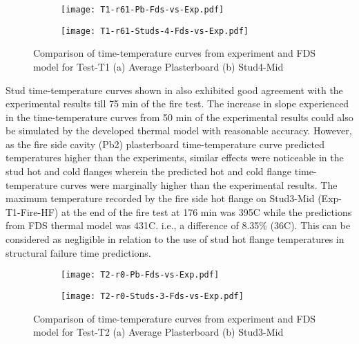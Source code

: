 \begin{figure}[!htbp]
	\centering
	\begin{subfigure}[b]{0.7\textwidth}
		\centering
		\texttt{[image: T1-r61-Pb-Fds-vs-Exp.pdf]}
		\caption{}
		\label{subfig:T1-r61-Pb-Fds-vs-Exp}
	\end{subfigure}
	\begin{subfigure}[b]{0.6\textwidth}
		\centering
		\texttt{[image: T1-r61-Studs-4-Fds-vs-Exp.pdf]}
		\caption{}
		\label{subfig:T1-r61-Studs-4-Fds-vs-Exp}
	\end{subfigure}
	   \caption{Comparison of time-temperature curves from experiment and FDS model for Test-T1 (a) Average Plasterboard (b) Stud4-Mid}
	   \label{fig:fds-output-pb-studs-t1}
\end{figure}

Stud time-temperature curves shown in  also exhibited good agreement with the experimental results till 75 min of the fire test. The increase in slope experienced in the time-temperature curves from 50 min of the experimental results could also be simulated by the developed thermal model with reasonable accuracy. However, as the fire side cavity (Pb2) plasterboard time-temperature curve predicted temperatures higher than the experiments, similar effects were noticeable in the stud hot and cold flanges wherein the predicted hot and cold flange time-temperature curves were marginally higher than the experimental results. The maximum temperature recorded by the fire side hot flange on Stud3-Mid (Exp-T1-Fire-HF) at the end of the fire test at 176 min was 395\degree C while the predictions from FDS thermal model was 431\degree C. i.e., a difference of 8.35\% (36\degree C). This can be considered as negligible in relation to the use of stud hot flange temperatures in  structural failure time predictions. 
\begin{figure}[!htbp]
	\centering
	\begin{subfigure}[b]{0.7\textwidth}
		\centering
		\texttt{[image: T2-r0-Pb-Fds-vs-Exp.pdf]}
		\caption{}
		\label{subfig:T2-r0-Pb-Fds-vs-Exp}
	\end{subfigure}
	\begin{subfigure}[b]{0.6\textwidth}
		\centering
		\texttt{[image: T2-r0-Studs-3-Fds-vs-Exp.pdf]}
		\caption{}
		\label{subfig:T2-r0-Studs-3-Fds-vs-Exp}
	\end{subfigure}
	   \caption{Comparison of time-temperature curves from experiment and FDS model for Test-T2 (a) Average Plasterboard (b) Stud3-Mid}
	   \label{fig:fds-output-pb-studs-t2}
\end{figure}

